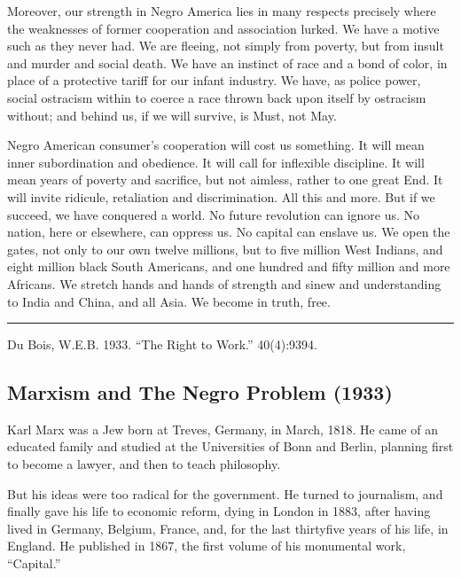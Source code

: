 \documentclass[letterpaper,10pt,english]{jupyterBook}
\begin{document}
\sphinxAtStartPar
Moreover, our strength in Negro America lies in many respects precisely where the weaknesses of former cooperation and association lurked. We have a motive such as they never had. We are fleeing, not simply from poverty, but from insult and murder and social death. We have an instinct of race and a bond of color, in place of a protective tariff for our infant industry. We have, as police power, social ostracism within to coerce a race thrown back upon itself by ostracism without; and behind us, if we will survive, is Must, not May.



\sphinxAtStartPar
Negro American consumer’s cooperation will cost us something. It will mean inner subordination and obedience. It will call for inflexible discipline. It will mean years of poverty and sacrifice, but not aimless, rather to one great End. It will invite ridicule, retaliation and discrimination. All this and more. But if we succeed, we have conquered a world. No future revolution can ignore us. No nation, here or elsewhere, can oppress us. No capital can enslave us. We open the gates, not only to our own twelve millions, but to five million West Indians, and eight million black South Americans, and one hundred and fifty million and more Africans. We stretch hands and hands of strength and sinew and understanding to India and China, and all Asia. We become in truth, free.


\bigskip\hrule\bigskip


\sphinxAtStartPar
{} Du Bois, W.E.B. 1933. “The Right to Work.” 40(4):93\sphinxhyphen{}94.


\subsection{Marxism and The Negro Problem (1933)}
\label{\detokenize{Volumes/40/05/marxism_and_the_negro_problem:marxism-and-the-negro-problem-1933}}\label{\detokenize{Volumes/40/05/marxism_and_the_negro_problem::doc}}
\sphinxAtStartPar
Karl Marx was a Jew born at Treves, Germany, in March, 1818. He came of an educated family and studied at the Universities of Bonn and Berlin, planning first to become a lawyer, and then to teach philosophy.

\sphinxAtStartPar
But his ideas were too radical for the government. He turned to journalism, and finally gave his life to economic reform, dying in London in 1883, after having lived in Germany, Belgium, France, and, for the last thirty\sphinxhyphen{}five years of his life, in England. He published in 1867, the first volume of his monumental work, “Capital.”
\end{document}
